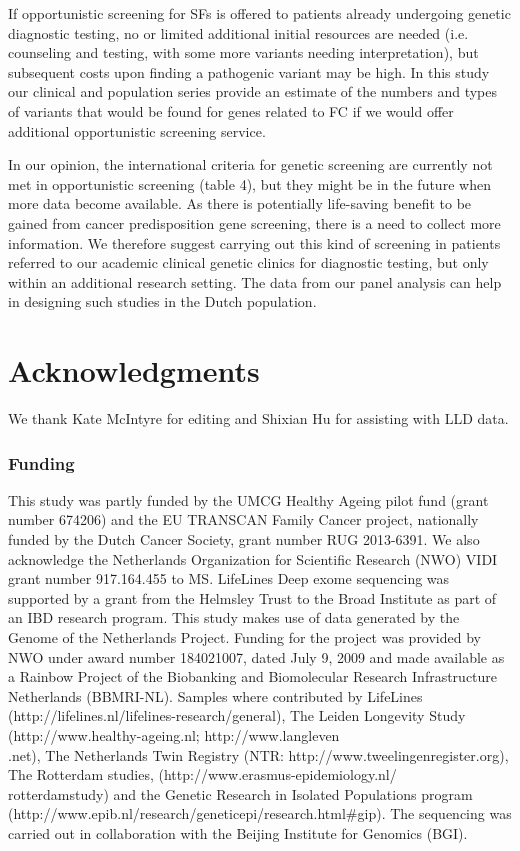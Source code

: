 If opportunistic screening for SFs is offered to patients already undergoing genetic diagnostic testing, no or limited additional initial resources are needed (i.e. counseling and testing, with  some more variants needing interpretation), but subsequent costs upon finding a pathogenic variant may be high. 
In this study our clinical and population series provide an estimate of the numbers and types of variants that would be found for genes related to FC if we would offer additional opportunistic screening service. 

In our opinion, the international criteria for genetic screening are currently not met in opportunistic screening (table 4), but they might be in the future when more data become available.  %
As there is potentially life-saving benefit to be gained from cancer predisposition gene screening, there is a need to collect more information. 
We therefore suggest carrying out this kind of screening in patients referred to our academic clinical genetic clinics for diagnostic testing, but only within an additional research setting. 
The data from our panel analysis can help in designing such studies in the Dutch population.




\section{Acknowledgments}\label{Acknowledgments} 
We thank Kate McIntyre for editing and Shixian Hu for assisting with LLD data.

\subsubsection{Funding}
This study was partly funded by the UMCG Healthy Ageing pilot fund (grant number 674206) and the EU TRANSCAN Family Cancer project, nationally funded by the Dutch Cancer Society, grant number RUG 2013-6391. We also acknowledge the Netherlands Organization for Scientific Research (NWO) VIDI grant number 917.164.455 to MS. LifeLines Deep exome sequencing was supported by a grant from the Helmsley Trust to the Broad Institute as part of an IBD research program. This study makes use of data generated by the Genome of the Netherlands Project. Funding for the project was provided by NWO under award number 184021007, dated July 9, 2009 and made available as a Rainbow Project of the Biobanking and Biomolecular Research Infrastructure Netherlands (BBMRI-NL). Samples where contributed by LifeLines (http://lifelines.nl/lifelines-research/general), The Leiden Longevity Study (http://www.healthy-ageing.nl; http://www.langleven\\.net), The Netherlands Twin Registry (NTR: http://www.tweelingenregister.org), The Rotterdam studies, (http://www.erasmus-epidemiology.nl/\\rotterdamstudy) and the Genetic Research in Isolated Populations program (http://www.epib.nl/research/geneticepi/research.html\#gip). The sequencing was carried out in collaboration with the Beijing Institute for Genomics (BGI).

